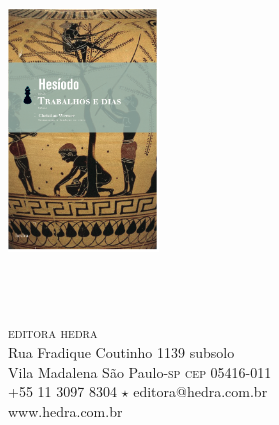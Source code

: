 \documentclass[a4paper,11pt]{article}
\newcommand{\titulo}[1]{\def\titulo{#1}}
\newcommand{\autor}[1]{\def\autor{#1}}
\newcommand{\isbn}[1]{\def\isbn{\textsc{isbn:} #1}}
\newcommand{\preco}[1]{\def\preco{R\$ #1,00}}
\newcommand{\pag}[1]{\def\pag{#1 páginas}}
\newcommand{\release}[1]{\def\release{#1}}
\begin{document}

\pagestyle{empty}
\vspace*{-12mm}
		\noindent\begin{minipage}[c]{4.2cm}
			\includegraphics[width=4cm]{capa.png}
		\end{minipage}
		\begin{minipage}[c]{7cm}\begin{flushleft}
		\baselineskip
		{\Huge\textsc{\titulo}}\\
		\baselineskip
		{\smallskip\Large\textit{\autor}\vspace{1mm}}\\
		\isbn\\
		\preco\\
		\pag\\
		\end{flushleft}\end{minipage}

\vspace{-5mm}
\noindent\dotfill

\noindent\textsc{editora hedra}\\
Rua Fradique Coutinho 1139 subsolo\\
Vila Madalena São Paulo-\textsc{sp} \textsc{cep} 05416-011\\
+55 11 3097 8304 $\star$ editora@hedra.com.br\\
www.hedra.com.br
\end{document}
